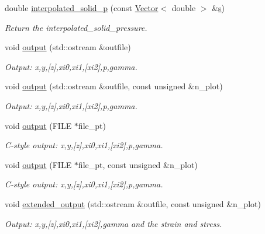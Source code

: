 \begin{DoxyCompactItemize}
double \hyperlink{classoomph_1_1PVDEquationsWithPressure_a9d8ecc731f98d8d4aae18b55f835bc61}{interpolated\+\_\+solid\+\_\+p} (const \hyperlink{classoomph_1_1Vector}{Vector}$<$ double $>$ \&\hyperlink{cfortran_8h_ab7123126e4885ef647dd9c6e3807a21c}{s})
\begin{DoxyCompactList}\small\item\em Return the interpolated\+\_\+solid\+\_\+pressure. \end{DoxyCompactList}\item 
void \hyperlink{classoomph_1_1PVDEquationsWithPressure_a1853eace3f079f90cc34df8029bd3dba}{output} (std\+::ostream \&outfile)
\begin{DoxyCompactList}\small\item\em Output\+: x,y,\mbox{[}z\mbox{]},xi0,xi1,\mbox{[}xi2\mbox{]},p,gamma. \end{DoxyCompactList}\item 
void \hyperlink{classoomph_1_1PVDEquationsWithPressure_a3522de42dcebba5f7531c5913857303d}{output} (std\+::ostream \&outfile, const unsigned \&n\+\_\+plot)
\begin{DoxyCompactList}\small\item\em Output\+: x,y,\mbox{[}z\mbox{]},xi0,xi1,\mbox{[}xi2\mbox{]},p,gamma. \end{DoxyCompactList}\item 
void \hyperlink{classoomph_1_1PVDEquationsWithPressure_ae6d9a646cfd9be12134aeba45249d7c7}{output} (F\+I\+LE $\ast$file\+\_\+pt)
\begin{DoxyCompactList}\small\item\em C-\/style output\+: x,y,\mbox{[}z\mbox{]},xi0,xi1,\mbox{[}xi2\mbox{]},p,gamma. \end{DoxyCompactList}\item 
void \hyperlink{classoomph_1_1PVDEquationsWithPressure_a27aee23c253bef90a7f389acd376fd27}{output} (F\+I\+LE $\ast$file\+\_\+pt, const unsigned \&n\+\_\+plot)
\begin{DoxyCompactList}\small\item\em C-\/style output\+: x,y,\mbox{[}z\mbox{]},xi0,xi1,\mbox{[}xi2\mbox{]},p,gamma. \end{DoxyCompactList}\item 
void \hyperlink{classoomph_1_1PVDEquationsWithPressure_a9b47b97cb7f3dafac867a0af20650d0d}{extended\+\_\+output} (std\+::ostream \&outfile, const unsigned \&n\+\_\+plot)
\begin{DoxyCompactList}\small\item\em Output\+: x,y,\mbox{[}z\mbox{]},xi0,xi1,\mbox{[}xi2\mbox{]},gamma and the strain and stress. \end{DoxyCompactList}\item 

\end{DoxyCompactItemize}
